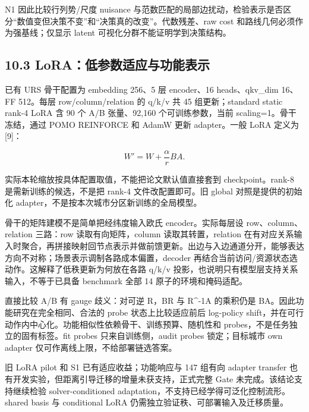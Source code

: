 \documentclass[UTF8,10pt,a4paper,fontset=fandol]{ctexart}
\begin{document}
N1 因此比较行列势/\allowbreak{}尺度 nuisance 与范数匹配的局部边扰动，检验表示是否区分“数值变但决策不变”和“决策真的改变”。代数残差、raw cost 和路线几何必须作为强基线；仅显示 latent 可视化分群不能证明学到决策结构。


\subsection*{10.3 LoRA：低参数适应与功能表示}


已有 URS 骨干配置为 embedding 256、5 层 encoder、16 heads、qkv\_\allowbreak{}dim 16、FF 512。每层 row/\allowbreak{}column/\allowbreak{}relation 的 q/\allowbreak{}k/\allowbreak{}v 共 45 组更新；standard static rank-4 LoRA 含 90 个 A/\allowbreak{}B 张量、92,160 个可训练参数，当前 scaling=1。骨干冻结，通过 POMO REINFORCE 和 AdamW 更新 adapter。一般 LoRA 定义为[9]：


\begin{equation}
W'=W+\frac{\alpha}{r}BA.
\end{equation}

实际本轮缩放按具体配置取值，不能把论文默认值直接套到 checkpoint。rank-8 是需新训练的候选，不是把 rank-4 文件改配置即可。旧 global 对照是提供的初始化 adapter，不是按本次城市分区新训练的全局模型。


骨干的矩阵建模不是简单把经纬度输入欧氏 encoder。实际每层设 row、column、relation 三路：row 读取有向矩阵，column 读取其转置，relation 在有对应关系输入时聚合，再拼接映射回节点表示并做前馈更新。出边与入边通道分开，能够表达方向不对称；场景表示调制各路成本偏置，decoder 再结合当前访问/\allowbreak{}资源状态选动作。这解释了低秩更新为何放在各路 q/\allowbreak{}k/\allowbreak{}v 投影，也说明只有模型层支持关系输入，不等于已具备 benchmark 全部 14 原子的环境和掩码适配。


直接比较 A/\allowbreak{}B 有 gauge 歧义：对可逆 R，BR 与 R\textasciicircum{}-1A 的乘积仍是 BA。因此功能研究在完全相同、合法的 probe 状态上比较适应前后 log-policy shift，并在可行动作内中心化。功能相似性依赖骨干、训练预算、随机性和 probes，不是任务独立的固有标签。fit probes 只来自训练侧，audit probes 锁定；目标城市 own adapter 仅可作离线上限，不给部署链选答案。


旧 LoRA pilot 和 S1 已有适应收益；功能响应与 147 组有向 adapter transfer 也有开发实验，但距离引导迁移的增量未获支持，正式完整 Gate 未完成。该结论支持继续检验 solver-conditioned adaptation，不支持已经学得可泛化控制流形。shared basis 与 conditional LoRA 仍需独立验证秩、可部署输入及迁移质量。
\end{document}
